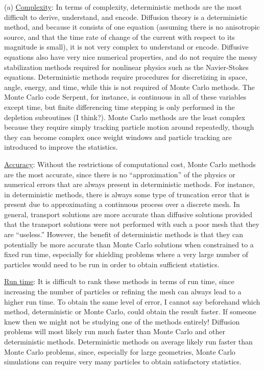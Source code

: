 \documentclass[10pt]{article}
\newcommand*\circled[1]{\tikz[baseline=(char.base)]{
            \node[shape=circle,draw,inner sep=2pt] (char) {#1};}}
\begin{document}
\circled{3} (a) \underline{Complexity}: In terms of complexity, deterministic methods are the most difficult to derive, understand, and encode. Diffusion theory is a deterministic method, and because it consists of one equation (assuming there is no anisotropic source, and that the time rate of change of the current with respect to its magnitude is small), it is not very complex to understand or encode. Diffusive equations also have very nice numerical properties, and do not require the messy stabilization methods required for nonlinear physics such as the Navier-Stokes equations. Deterministic methods require procedures for discretizing in space, angle, energy, and time, while this is not required of Monte Carlo methods. The Monte Carlo code Serpent, for instance, is continuous in all of these variables except time, but finite differencing time stepping is only performed in the depletion subroutines (I think?). Monte Carlo methods are the least complex because they require simply tracking particle motion around repeatedly, though they can become complex once weight windows and particle tracking are introduced to improve the statistics.\newline

\underline{Accuracy}: Without the restrictions of computational cost, Monte Carlo methods are the most accurate, since there is no ``approximation'' of the physics or numerical errors that are always present in deterministic methods. For instance, in deterministic methods, there is always some type of truncation error that is present due to approximating a continuous process over a discrete mesh. In general, transport solutions are more accurate than diffusive solutions provided that the transport solutions were not performed with such a poor mesh that they are ``useless.'' However, the benefit of deterministic methods is that they can potentially be more accurate than Monte Carlo solutions when constrained to a fixed run time, especially for shielding problems where a very large number of particles would need to be run in order to obtain sufficient statistics.\newline

\underline{Run time}: It is difficult to rank these methods in terms of run time, since increasing the number of particles or refining the mesh can always lead to a higher run time. To obtain the same level of error, I cannot say beforehand which method, deterministic or Monte Carlo, could obtain the result faster. If someone knew then we might not be studying one of the methods entirely! Diffusion problems will most likely run much faster than Monte Carlo and other deterministic methods. Deterministic methods on average likely run faster than Monte Carlo problems, since, especially for large geometries, Monte Carlo simulations can require very many particles to obtain satisfactory statistics.\newline
\end{document}
